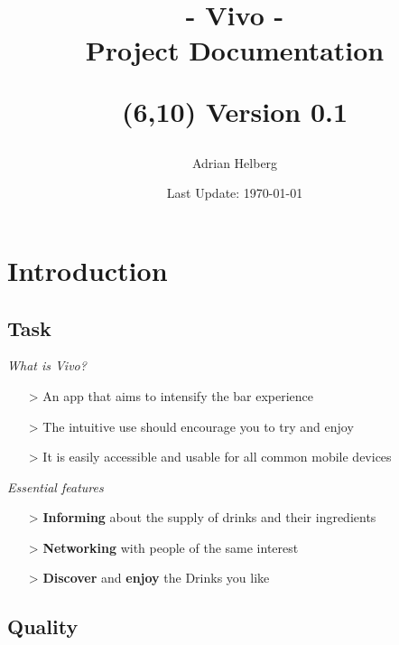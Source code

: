 \documentclass[11pt]{article}
\title{
    \fontsize{38pt}{42pt}\selectfont - \textbf{Vivo} -\\ Project Documentation
    \author{Adrian Helberg}
    \date{Last Update: \today}
    \begin{textblock}{4}(6,10)
    \Huge Version 0.1
    \end{textblock}
}
\begin{document}
    \maketitle
    \newpage
    \tableofcontents
    \newpage

    \section{Introduction}

    \subsection{Task}

    \textit{What is Vivo?}
    \begin{itemize}
        \item[>] An app that aims to intensify the bar experience
        \item[>] The intuitive use should encourage you to try and enjoy
        \item[>] It is easily accessible and usable for all common mobile devices
    \end{itemize}
    \textit{Essential features}
    \begin{itemize}
        \item[>] \textbf{Informing} about the supply of drinks and their ingredients
        \item[>] \textbf{Networking} with people of the same interest
        \item[>] \textbf{Discover} and \textbf{enjoy} the Drinks you like
    \end{itemize}

    \subsection{Quality}
\end{document}
